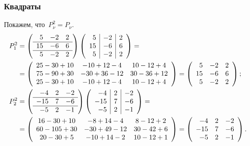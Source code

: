 \begin{solution}
	\subsubsection{Квадраты}
		Покажем, что~$P_\nu^2 = P_\nu$.
		\begin{align*}
			P_1^2 &=
			\left(
				\begin{array}{rrr}
					5 & -2 & 2
					\\
					\hline
					15 & -6 & 6
					\\
					\hline
					5 & -2 & 2
				\end{array}
			\right)
			\left(
				\begin{array}{r|r|r}
					5 & -2 & 2
					\\
					15 & -6 & 6
					\\
					5 & -2 & 2
				\end{array}
			\right)
			= {} \\ {} &=
			\left(
				\begin{array}{ccc}
					25 - 30 + 10 &
					-10 + 12 - 4 &
					10 - 12 + 4
					\\
					75 - 90 + 30 &
					-30 + 36 - 12 &
					 30 - 36 + 12
					\\
					25 - 30 + 10 &
					-10 + 12 - 4 &
					10 - 12 + 4
				\end{array}
			\right)
			=
			\left(
				\begin{array}{rrr}
					5 & -2 & 2
					\\
					15 & -6 & 6
					\\
					5 & -2 & 2
				\end{array}
			\right)
			;
			\\
			P_2^2 &=
			\left(
				\begin{array}{rrr}
					-4 & 2 & -2
					\\
					\hline
					-15 & 7 & -6
					\\
					\hline
					-5 & 2 & -1
				\end{array}
			\right)
			\left(
				\begin{array}{r|r|r}
					-4 & 2 & -2
					\\
					-15 & 7 & -6
					\\
					-5 & 2 & -1
				\end{array}
			\right)
			= {} \\ {} &=
			\left(
				\begin{array}{ccc}
					16 - 30 + 10 &
					-8 + 14 - 4 &
					8 -12 + 2
					\\
					60 - 105 + 30 &
					-30 + 49 - 12 &
					30 - 42 + 6
					\\
					20 - 30 + 5 &
					-10 + 14 - 2 &
					10 - 12 + 1
				\end{array}
			\right)
			=
			\left(
				\begin{array}{rrr}
					-4 & 2 & -2
					\\
					-15 & 7 & -6
					\\
					-5 & 2 & -1
				\end{array}
			\right)
			.
		\end{align*}


\end{solution}
